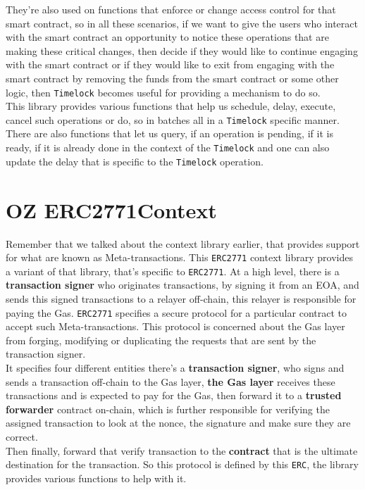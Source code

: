 They're also used on functions that enforce or change access control for that smart contract, so in all these scenarios, if we want to give the users who interact with the smart contract an opportunity to notice these operations that are making these critical changes, then decide if they would like to continue engaging with the smart contract or if they would like to exit from engaging with the smart contract by removing the funds from the smart contract or some other logic, then \verb|Timelock| becomes useful for providing a mechanism to do so.\\

This library provides various functions that help us schedule, delay, execute, cancel such operations or do, so in batches all in a \verb|Timelock| specific manner. There are also functions that let us query, if an operation is pending, if it is ready, if it is already done in the context of the \verb|Timelock| and one can also update the delay that is specific to the \verb|Timelock| operation.

\section{OZ ERC2771Context}
Remember that we talked about the context library earlier, that provides support for what are known as Meta-transactions. This \verb|ERC2771| context library provides a variant of that library, that's specific to \verb|ERC2771|. At a high level, there is a \textbf{transaction signer} who originates transactions, by signing it from an EOA, and sends this signed transactions to a relayer off-chain, this relayer is responsible for paying the Gas. \verb|ERC2771| specifies a secure protocol for a particular contract to accept such Meta-transactions. This protocol is concerned about the Gas layer from forging, modifying or duplicating the requests that are sent by the transaction signer.\\

It specifies four different entities there's a \textbf{transaction signer}, who signs and sends a transaction off-chain to the Gas layer, \textbf{the Gas layer} receives these transactions and is expected to pay for the Gas, then forward it to a \textbf{trusted forwarder} contract on-chain, which is further responsible for verifying the assigned transaction to look at the nonce, the signature and make sure they are correct.\\

Then finally, forward that verify transaction to the \textbf{contract} that is the ultimate destination for the transaction. So this protocol is defined by this \verb|ERC|, the library provides various functions to help with it.


